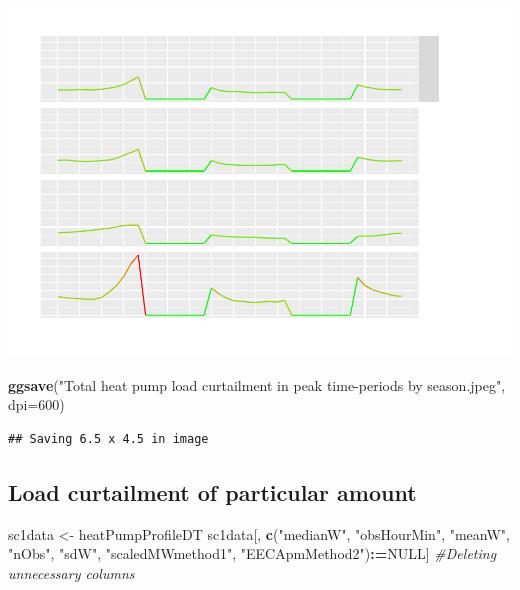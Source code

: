 \documentclass[]{article}
\newenvironment{Shaded}{\begin{snugshade}}{\end{snugshade}}
\newcommand{\KeywordTok}[1]{\textcolor[rgb]{0.13,0.29,0.53}{\textbf{#1}}}
\newcommand{\DataTypeTok}[1]{\textcolor[rgb]{0.13,0.29,0.53}{#1}}
\newcommand{\DecValTok}[1]{\textcolor[rgb]{0.00,0.00,0.81}{#1}}
\newcommand{\StringTok}[1]{\textcolor[rgb]{0.31,0.60,0.02}{#1}}
\newcommand{\CommentTok}[1]{\textcolor[rgb]{0.56,0.35,0.01}{\textit{#1}}}
\newcommand{\OtherTok}[1]{\textcolor[rgb]{0.56,0.35,0.01}{#1}}
\newcommand{\OperatorTok}[1]{\textcolor[rgb]{0.81,0.36,0.00}{\textbf{#1}}}
\newcommand{\ErrorTok}[1]{\textcolor[rgb]{0.64,0.00,0.00}{\textbf{#1}}}
\newcommand{\NormalTok}[1]{#1}
\theoremstyle{definition}
\theoremstyle{definition}
\theoremstyle{definition}
\theoremstyle{remark}
\begin{document}
\includegraphics{heatPumpProfileAnalysis_files/figure-latex/setting peak periods to zero-1.pdf}

\begin{Shaded}
\begin{Highlighting}[]
\KeywordTok{ggsave}\NormalTok{(}\StringTok{"Total heat pump load curtailment in peak time-periods by season.jpeg"}\NormalTok{,}
       \DataTypeTok{dpi=}\DecValTok{600}\NormalTok{) }
\end{Highlighting}
\end{Shaded}

\begin{verbatim}
## Saving 6.5 x 4.5 in image
\end{verbatim}

\subsection{Load curtailment of particular
amount}\label{load-curtailment-of-particular-amount}

\begin{Shaded}
\begin{Highlighting}[]
\NormalTok{sc1data <-}\StringTok{ }\NormalTok{heatPumpProfileDT}
\NormalTok{sc1data[, }\KeywordTok{c}\NormalTok{(}\StringTok{"medianW"}\NormalTok{, }\StringTok{"obsHourMin"}\NormalTok{, }\StringTok{"meanW"}\NormalTok{, }\StringTok{"nObs"}\NormalTok{, }\StringTok{"sdW"}\NormalTok{,}
            \StringTok{"scaledMWmethod1"}\NormalTok{, }\StringTok{"EECApmMethod2"}\NormalTok{)}\OperatorTok{:}\ErrorTok{=}\OtherTok{NULL}\NormalTok{] }\CommentTok{#Deleting unnecessary columns}
\end{Highlighting}
\end{Shaded}
\end{document}
